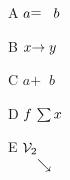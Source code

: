 \documentclass{article}
\begin{document}
A $a \raisebox{1pt}{$=\phantom{x}$} b$

B $x \mbox{$\to\vphantom{X}$} y$

C $a \mathbin{+\phantom{x}} b$

D $f\mathop{\vphantom{X}\sum} x$

E $\mathcal{V}_{2}\raisebox{-12pt}{$\searrow\vphantom{\raisebox{-2pt}{$\searrow$}}$\hskip-8pt}$
\end{document}
